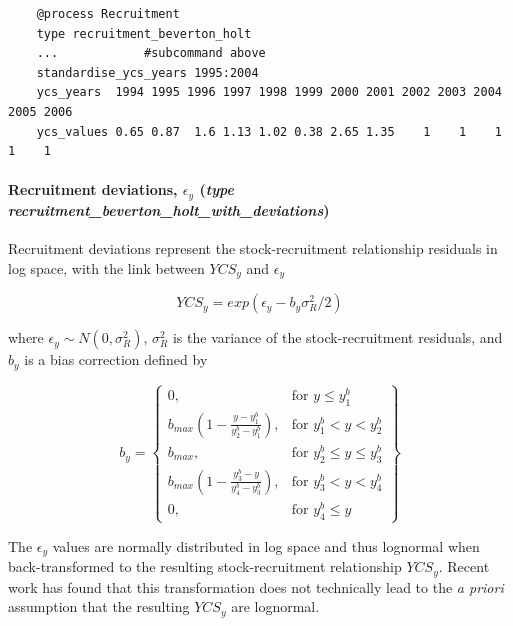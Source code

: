 {\small{\begin{verbatim}
	@process Recruitment
	type recruitment_beverton_holt
	...            #subcommand above
	standardise_ycs_years 1995:2004
	ycs_years  1994 1995 1996 1997 1998 1999 2000 2001 2002 2003 2004 2005 2006
	ycs_values 0.65 0.87  1.6 1.13 1.02 0.38 2.65 1.35    1    1    1    1    1
\end{verbatim}}}


\paragraph*{Recruitment deviations, $\epsilon_y$ (\emph{type recruitment\_beverton\_holt\_with\_deviations})} \label{sec:Process-RecruitmentBevertonHoltWithDeviations} 

Recruitment deviations represent the stock-recruitment relationship residuals in log space, with the link between $YCS_y$ and $\epsilon_y$

\begin{equation}\label{eq:recruit_devs}
	YCS_y = exp(\epsilon_y - b_y\sigma^2_R / 2)
\end{equation}

where $\epsilon_y\sim N(0,\sigma^2_R)$, $\sigma^2_R$ is the variance of the stock-recruitment residuals, and $b_y$ is a bias correction defined by \cite{methot2011adjusting}

\begin{equation}\label{eq::bias}
b_y = \left\{\begin{array}{lr}
0, & \text{for }y\leq y_1^b\\
b_{max}(1 - \frac{y - y_1^b}{y_2^b - y_1^b}), & \text{for } y_1^b < y < y_2^b\\
b_{max}, & \text{for } y_2^b\leq y \leq y_3^b\\
b_{max}(1 - \frac{y_3^b - y}{y_4^b - y_3^b}), & \text{for }  y_3^b< y < y_4^b\\
0, & \text{for } y_4^b\leq y
\end{array}\right\}
\end{equation}

The $\epsilon_y$ values are normally distributed in log space and thus lognormal when back-transformed to the resulting stock-recruitment relationship $YCS_y$. Recent work has found that this transformation does not technically lead to the \textit{a priori} assumption that the resulting $YCS_y$ are lognormal. 

